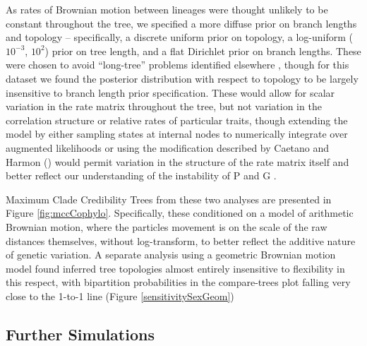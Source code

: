 As rates of Brownian motion between lineages were thought unlikely to be constant throughout the tree, we specified a more diffuse prior on branch lengths and topology – specifically, a discrete uniform prior on topology, a log-uniform ($10^{-3}$, $10^2$) prior on tree length, and a flat Dirichlet prior on branch lengths. These were chosen to avoid “long-tree” problems identified elsewhere \citep{brownWhenTreesGrow2009}, though for this dataset we found the posterior distribution with respect to topology to be largely insensitive to branch length prior specification. These would allow for scalar variation in the rate matrix throughout the tree, but not variation in the correlation structure or relative rates of particular traits, though extending the model by either sampling states at internal nodes to numerically integrate over augmented likelihoods or using the modification described by Caetano and Harmon (\citeyear{caetanoEstimatingCorrelatedRates2019}) would permit variation in the structure of the rate matrix itself and better reflect our understanding of the instability of P \citep{fischerPlasticityEvolutionCorrelated2016} and G \citep{arnoldUnderstandingEvolutionStability2008}.

Maximum Clade Credibility Trees from these two analyses are presented in Figure \ref{fig:mccCophylo}. Specifically, these conditioned on a model of arithmetic Brownian motion, where the particles movement is on the scale of the raw distances themselves, without log-transform, to better reflect the additive nature of genetic variation. A separate analysis using a geometric Brownian motion model found inferred tree topologies almost entirely insensitive to flexibility in this respect, with bipartition probabilities in the compare-trees plot falling very close to the 1-to-1 line (Figure \ref{sensitivitySexGeom})

\subsection{Further Simulations}

